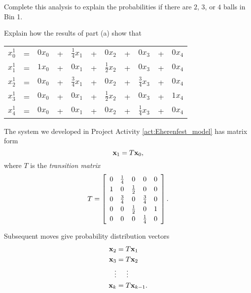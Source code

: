 \begin{pactivity}
\ba
\item Complete this analysis to explain the probabilities if there are $2$, $3$, or $4$ balls in Bin 1.

\item Explain how the results of part (a) show that 
\begin{center}
\setlength{\tabcolsep}{.26667em}
\begin{tabular}{rcccccccccc} \\
$x_0^1$ &= &$0x_0$ &+ &$\frac{1}{4} x_1$	&+  &$0 x_2$ 				&+ &$0 x_3$ 				&+ &$0 x_4$ \\
$x_1^1$ &= &$1x_0$ &+ &$0 x_1$ 			    &+ &$\frac{1}{2} x_2$	    &+  &$0 x_3$ 				&+  &$0 x_4$ \\
$x_2^1$ &= &$0x_0$ &+ &$\frac{3}{4} x_1$ 	&+ &$0 x_2$ 				&+ &$\frac{3}{4} x_3$ 	    &+ &$0 x_4$ \\
$x_3^1$ &= &$0x_0$ &+ &$0 x_1$ 			    &+ &$\frac{1}{2} x_2$ 	    &+ &$0 x_3$ 				&+ &$1 x_4$ \\
$x_4^1$ &= &$0x_0$ &+ &$0 x_1$ 			    &+ &$0 x_2$ 				&+ &$\frac{1}{4} x_3$	    &+ &$0 x_4$ \\
\end{tabular}
\end{center}

\ea

\end{pactivity}

The system we developed in Project Activity \ref{act:Eherenfest_model} has matrix form
\[\mathbf{x}_1 = T \mathbf{x}_0,\]
where $T$ is the \emph{transition matrix}
\[T = \left[ \renewcommand{\arraystretch}{1.2} \begin{array}{ccccc}
0 & \frac{1}{4}	& 0 			& 0 			& 0 \\
1 & 0 			& \frac{1}{2}	& 0 			& 0 \\
0 & \frac{3}{4} & 0 			& \frac{3}{4} 	& 0 \\
0 & 0 			& \frac{1}{2} 	& 0 			& 1 \\
0 & 0 			& 0 			& \frac{1}{4}	& 0 \\
\end{array} \right].\]

Subsequent moves give probability distribution vectors 
\begin{align*}
\mathbf{x}_2 &= T\mathbf{x}_1 \\
\mathbf{x}_3 &= T\mathbf{x}_2  \\
\vdots & \hspace{0.2in} \vdots \\
\mathbf{x}_k &= T\mathbf{x}_{k-1} .
\end{align*}

